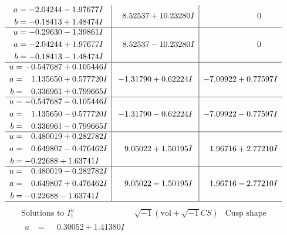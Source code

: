 \documentclass[1p]{elsarticle_modified}
\theoremstyle{definition}
\newcommand{\I}{\sqrt{-1}}
\begin{document}
$$\begin{array}{c|c|c}
\begin{aligned}
a &= -2.04244 - 1.97677 I \\
b &= -0.18413 + 1.48474 I\end{aligned}
 & \phantom{-}8.52537 + 10.23280 I & \phantom{-0.000000 } 0 \\ \hline\begin{aligned}
u &= -0.29630 - 1.39861 I \\
a &= -2.04244 + 1.97677 I \\
b &= -0.18413 - 1.48474 I\end{aligned}
 & \phantom{-}8.52537 - 10.23280 I & \phantom{-0.000000 } 0 \\ \hline\begin{aligned}
u &= -0.547687 + 0.105446 I \\
a &= \phantom{-}1.135650 + 0.577720 I \\
b &= \phantom{-}0.336961 + 0.799665 I\end{aligned}
 & -1.31790 + 0.62224 I & -7.09922 + 0.77597 I \\ \hline\begin{aligned}
u &= -0.547687 - 0.105446 I \\
a &= \phantom{-}1.135650 - 0.577720 I \\
b &= \phantom{-}0.336961 - 0.799665 I\end{aligned}
 & -1.31790 - 0.62224 I & -7.09922 - 0.77597 I \\ \hline\begin{aligned}
u &= \phantom{-}0.480019 + 0.282782 I \\
a &= \phantom{-}0.649807 - 0.476462 I \\
b &= -0.22688 + 1.63741 I\end{aligned}
 & \phantom{-}9.05022 + 1.50195 I & \phantom{-}1.96716 + 2.77210 I \\ \hline\begin{aligned}
u &= \phantom{-}0.480019 - 0.282782 I \\
a &= \phantom{-}0.649807 + 0.476462 I \\
b &= -0.22688 - 1.63741 I\end{aligned}
 & \phantom{-}9.05022 - 1.50195 I & \phantom{-}1.96716 - 2.77210 I\\
 \hline 
 \end{array}$$\newpage$$\begin{array}{c|c|c}  
\text{Solutions to }I^u_{1}& \I (\text{vol} + \sqrt{-1}CS) & \text{Cusp shape}\\
 \hline 
\begin{aligned}
u &= \phantom{-}0.30052 + 1.41380 I \\

\end{aligned}
\end{array}$$
\end{document}
